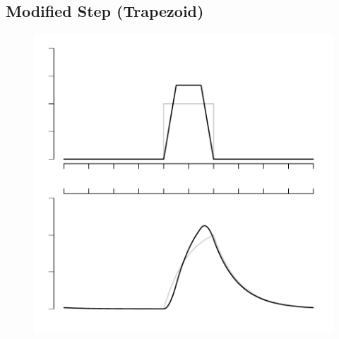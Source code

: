 \documentclass{article}
\begin{document}
\subsection{Modified Step (Trapezoid)}
\begin{figure}
\begin{center}
\includegraphics{synthetic-donations-pstrap}
\end{center}
\end{figure}
\end{document}
